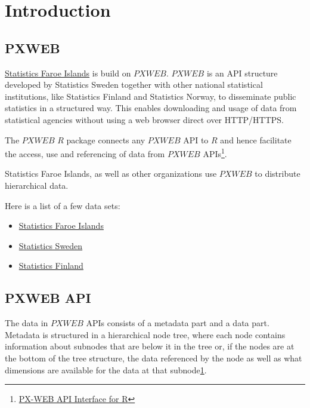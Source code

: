 \section*{Introduction}

\subsection*{PXWEB}
\href{https://statbank.hagstova.fo/pxweb/fo/H2}{Statistics Faroe Islands} is build on $PXWEB$. $PXWEB$ is an API structure developed by Statistics Sweden together with other national statistical institutions, like Statistics Finland and Statistics Norway, to disseminate public statistics in a structured way. This enables downloading and usage of data from statistical agencies without using a web browser direct over HTTP/HTTPS.

The $PXWEB$ $R$ package connects any $PXWEB$ API to $R$ and hence facilitate the access, use and referencing of data from $PXWEB$ APIs\footnote{\href{https://cran.r-project.org/web/packages/pxweb/vignettes/pxweb.html}{PX-WEB API Interface for R}\label{note1}}.

Statistics Faroe Islands, as well  as other organizations use $PXWEB$ to distribute hierarchical data. 

Here is a list of a few data sets:

\begin{itemize}
\item \href{https://statbank.hagstova.fo/pxweb/fo/H2}{Statistics Faroe Islands}
\item \href{http://www.statistikdatabasen.scb.se/pxweb/en/ssd/}{Statistics Sweden}
\item \href{https://tilastokeskus.fi/til/aihealuejako.html}{Statistics Finland}
\end{itemize}

\subsection*{PXWEB API}
The data in $PXWEB$ APIs consists of a metadata part and a data part. Metadata is structured in a hierarchical node tree, where each node contains information about subnodes that are below it in the tree or, if the nodes are at the bottom of the tree structure, the data referenced by the node as well as what dimensions are available for the data at that subnode\ref{note1}.